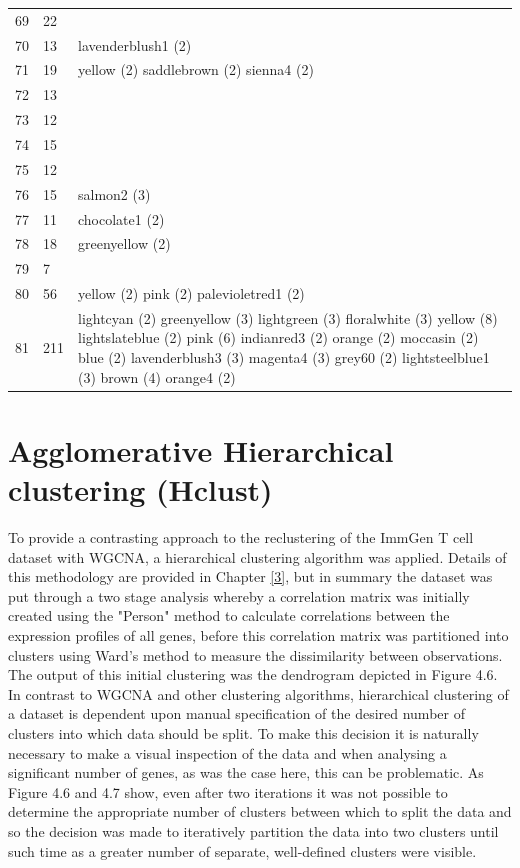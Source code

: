 \begin{landscape}
\begin{longtable}{|p{1.5cm}|p{1.25cm}|p{21cm}|}
69 & 22 & \\
70 & 13 & lavenderblush1 (2) \\
71 & 19 & yellow (2) saddlebrown (2) sienna4 (2) \\
72 & 13 & \\
73 & 12 & \\
74 & 15 & \\
75 & 12 & \\
76 & 15 & salmon2 (3) \\
77 & 11 & chocolate1 (2) \\
78 & 18 & greenyellow (2) \\
79 & 7 & \\
80 & 56 & yellow (2) pink (2) palevioletred1 (2) \\
81 & 211 & lightcyan (2) greenyellow (3) lightgreen (3) floralwhite (3) yellow (8) lightslateblue (2) pink (6) indianred3 (2) orange (2) moccasin (2) blue (2) lavenderblush3 (3) magenta4 (3) grey60 (2) lightsteelblue1 (3) brown (4) orange4 (2) \\
\hline
\end{longtable}
\end{landscape}

\section{Agglomerative Hierarchical clustering (Hclust)}

To provide a contrasting approach to the reclustering of the ImmGen T cell dataset with WGCNA, a hierarchical clustering algorithm was applied. Details of this methodology are provided in Chapter \ref{3}, but in summary the dataset was put through a two stage analysis whereby a correlation matrix was initially created using the "Person" method to calculate correlations between the expression profiles of all genes, before this correlation matrix was partitioned into clusters using Ward's method to measure the dissimilarity between observations. The output of this initial clustering was the dendrogram depicted in Figure 4.6. In contrast to WGCNA and other clustering algorithms, hierarchical clustering of a dataset is dependent upon manual specification of the desired number of clusters into which data should be split. To make this decision it is naturally necessary to make a visual inspection of the data and when analysing a significant number of genes, as was the case here, this can be problematic.  As Figure 4.6 and 4.7 show, even after two iterations it was not possible to determine the appropriate number of clusters between which to split the data and so the decision was made to iteratively partition the data into two clusters until such time as a greater number of separate, well-defined clusters were visible.


